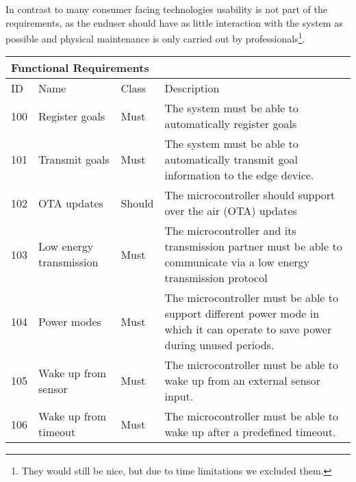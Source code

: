 In contrast to many consumer facing technologies usability is not part of the requirements, as the enduser should have as little interaction with the system as possible and physical maintenance is only carried out by professionals\footnote{They would still be nice, but due to time limitations we excluded them.}.\\
\begin{table}[]
    \begin{tabular}[t]{ l p{2.4cm} l p{7.6cm}}
        \multicolumn{4}{l}{Functional Requirements}                                                                                                                                           \\ \hline
        ID  & Name                      & Class & Description                                                                                                                        \\ \hline
        100 & Register goals            & Must           & The system must be able to automatically register goals                                                                            \\
        101 & Transmit goals            & Must           & The system must be able to automatically transmit goal information to the edge device.                                             \\
        102 & OTA updates               & Should         & The microcontroller should support over the air (OTA) updates                                                                      \\
        103 & Low energy transmission   & Must           & The microcontroller and its  transmission partner must be able to communicate via a low energy transmission protocol               \\
        104 & Power modes               & Must           & The microcontroller must be able to support different power mode in which it can operate to save power during unused periods.      \\
        105 & Wake up from sensor       & Must           & The microcontroller must be able to wake up from an external sensor input.                                                         \\
        106 & Wake up from timeout      & Must           & The microcontroller must be able to wake up after a predefined timeout.                                                            \\

\end{tabular}
\end{table}
